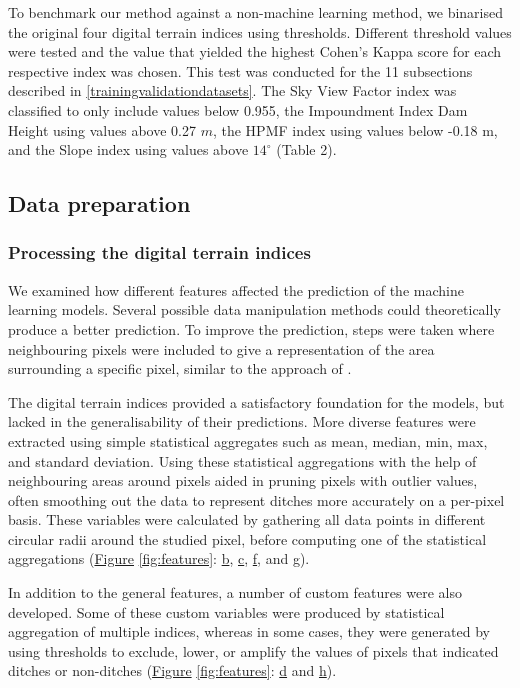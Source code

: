 \documentclass[11pt, review]{elsarticle} %
\begin{document}
To benchmark our method against a non-machine learning method, we binarised the original four digital terrain indices using thresholds. Different threshold values were tested and the value that yielded the highest Cohen's Kappa score for each respective index was chosen. This test was conducted for the 11 subsections described in \ref{trainingvalidationdatasets}. The Sky View Factor index was classified to only include values below 0.955, the Impoundment Index Dam Height using values above 0.27 $m$, the HPMF index using values below -0.18 m, and the Slope index using values above $14 ^{\circ}$ (Table 2).

\subsection{Data preparation}

\subsubsection{Processing the digital terrain indices}
We examined how different  features affected the prediction of the machine learning models. Several possible data manipulation methods could theoretically produce a better prediction. To improve the prediction, steps were taken where neighbouring pixels were included to give a representation of the area surrounding a specific pixel, similar to the approach of \citet{roelens}. 

The digital terrain indices provided a satisfactory foundation for the models, but lacked in the generalisability of their predictions. More diverse features were extracted using simple statistical aggregates such as mean, median, min, max, and standard deviation. Using these statistical aggregations with the help of neighbouring areas around pixels aided in pruning pixels with outlier values, often smoothing out the data to represent ditches more accurately on a per-pixel basis. These variables were calculated by gathering all data points in different circular radii around the studied pixel, before computing one of the statistical aggregations (\hyperref[fig:features]{Figure} \ref{fig:features}: \hyperref[fig:features]{b}, \hyperref[fig:features]{c}, \hyperref[fig:features]{f}, and \hyperref[fig:features]{g}).

In addition to the general features, a number of custom features were also developed.  Some of these custom variables were produced by statistical aggregation of multiple indices, whereas in some cases, they were generated by using thresholds to exclude, lower, or amplify the values of pixels that indicated ditches or non-ditches (\hyperref[fig:features]{Figure} \ref{fig:features}: \hyperref[fig:features]{d} and \hyperref[fig:features]{h}).
\end{document}
